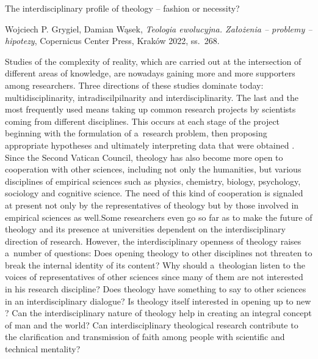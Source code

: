 \setcounter{secnumdepth}{0}







The interdisciplinary profile of theology -- fashion or necessity?



Wojciech P. Grygiel, Damian Wąsek, \textit{Teologia ewolucyjna. Założenia -- problemy -- hipotezy}, Copernicus Center Press, Kraków 2022, ss.~268.



Studies of the complexity of reality, which are carried out at the intersection of different areas of knowledge, are nowadays gaining more and more supporters among researchers. Three directions of these studies dominate today: multidisciplinarity, intradiscilpilnarity and interdisciplinarity. The last and the most frequently used means taking up common research projects by scientists coming from different disciplines. This occurs at each stage of the project beginning with the formulation of a~research problem, then proposing appropriate hypotheses and ultimately interpreting data that were obtained 
\parencite[][]{kasper_interdisziplinaritat_1996}. %
 Since the Second Vatican Council, theology has also become more open to cooperation with other sciences, including not only the humanities, but various disciplines of empirical sciences such as physics, chemistry, biology, psychology, sociology and cognitive science. The need of this kind of cooperation is signaled at present not only by the representatives of theology but by those involved in empirical sciences as well.Some researchers even go so far as to make the future of theology and its presence at universities dependent on the interdisciplinary direction of research. However, the interdisciplinary openness of theology raises a~number of questions: Does opening theology to other disciplines not threaten to break the internal identity of its content? Why should a~theologian listen to the voices of representatives of other sciences since many of them are not interested in his research discipline? Does theology have something to say to other sciences in an interdisciplinary dialogue? Is theology itself interested in opening up to new ? Can the interdisciplinary nature of theology help in creating an integral concept of man and the world? Can interdisciplinary theological research contribute to the clarification and transmission of faith among people with scientific and technical mentality?



